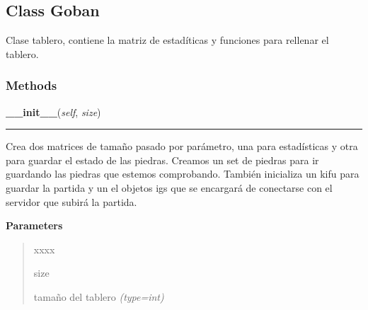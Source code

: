 
\subsection{Class Goban}

    \label{src:goban:Goban}

Clase tablero, contiene la matriz de estadíticas y funciones para rellenar el tablero.


  \subsubsection{Methods}

    \label{src:goban:Goban:__init__}

    \vspace{0.5ex}

\hspace{.8\funcindent}\begin{boxedminipage}{\funcwidth}

    \raggedright \textbf{\_\_init\_\_}(\textit{self}, \textit{size})

    \vspace{-1.5ex}

    \rule{\textwidth}{0.5\fboxrule}
\setlength{\parskip}{2ex}
Crea dos matrices de tamaño pasado por parámetro, una para estadísticas y otra para guardar el estado de las piedras. Creamos un set de piedras para ir guardando las piedras que estemos comprobando.  También inicializa un kifu para guardar la partida y un el objetos igs que se encargará de conectarse con el servidor que subirá la partida.

\setlength{\parskip}{1ex}
      \textbf{Parameters}
      \vspace{-1ex}

      \begin{quote}
        \begin{Ventry}{xxxx}

          \item[size]


tamaño del tablero
            {\it (type=int)}

        \end{Ventry}

      \end{quote}

    \end{boxedminipage}


